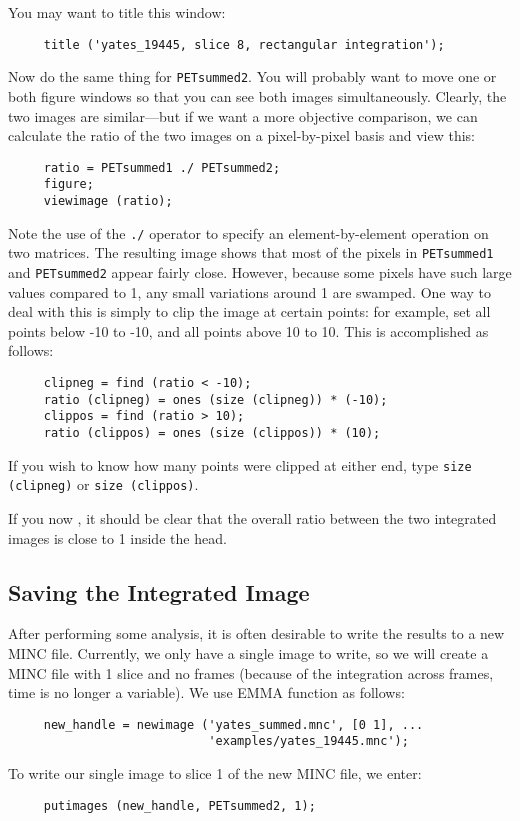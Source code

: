 You may want to title this window:
\begin{verbatim}
     title ('yates_19445, slice 8, rectangular integration');
\end{verbatim}

Now do the same thing for \verb|PETsummed2|.  You will probably want
to move one or both figure windows so that you can see both images
simultaneously.  Clearly, the two images are similar---but if we want
a more objective comparison, we can calculate the ratio of the two
images on a pixel-by-pixel basis and view this:
\begin{verbatim}
     ratio = PETsummed1 ./ PETsummed2;
     figure;
     viewimage (ratio);
\end{verbatim}

Note the use of the \verb|./| operator to specify an
element-by-element operation on two matrices.  The resulting image
shows that most of the pixels in \verb|PETsummed1| and
\verb|PETsummed2| appear fairly close.  However, because some pixels
have such large values compared to 1, any small variations around 1
are swamped.  One way to deal with this is simply to clip the image
at certain points: for example, set all points below -10 to -10, and
all points above 10 to 10.  This is accomplished as follows:
\begin{verbatim}
     clipneg = find (ratio < -10);
     ratio (clipneg) = ones (size (clipneg)) * (-10);
     clippos = find (ratio > 10);
     ratio (clippos) = ones (size (clippos)) * (10);
\end{verbatim}

If you wish to know how many points were clipped at either end,
type \verb|size (clipneg)| or \verb|size (clippos)|.

If you now , it should be clear that the
overall ratio between the two integrated images is close to 1 inside
the head.

\subsection{Saving the Integrated Image}

After performing some analysis, it is often desirable to write the
results to a new MINC file.  Currently, we only have a single image to
write, so we will create a MINC file with 1 slice and no frames
(because of the integration across frames, time is no longer a
variable).  We use EMMA function  as follows:
\begin{verbatim}
     new_handle = newimage ('yates_summed.mnc', [0 1], ...
                            'examples/yates_19445.mnc');
\end{verbatim}
To write our single image to slice 1 of the new MINC file, we enter:
\begin{verbatim}
     putimages (new_handle, PETsummed2, 1);
\end{verbatim}

